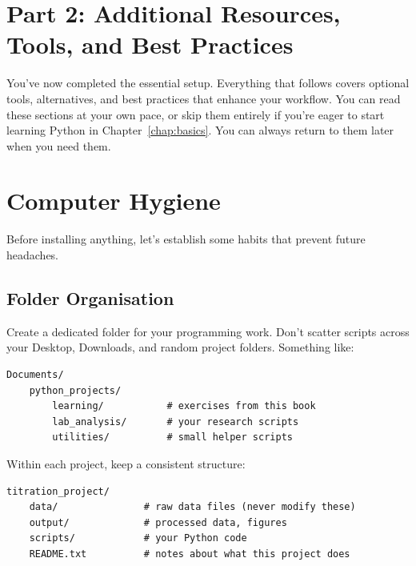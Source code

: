 
\section*{Part 2: Additional Resources, Tools, and Best Practices}

You've now completed the essential setup. Everything that follows covers optional tools, alternatives, and best practices that enhance your workflow. You can read these sections at your own pace, or skip them entirely if you're eager to start learning Python in Chapter~\ref{chap:basics}. You can always return to them later when you need them.


\section{Computer Hygiene}
\label{sec:hygiene}

Before installing anything, let's establish some habits that prevent future headaches.

\subsection{Folder Organisation}

Create a dedicated folder for your programming work. Don't scatter scripts across your Desktop, Downloads, and random project folders. Something like:

\begin{lstlisting}[style=shellstyle]
Documents/
    python_projects/
        learning/           # exercises from this book
        lab_analysis/       # your research scripts
        utilities/          # small helper scripts
\end{lstlisting}

Within each project, keep a consistent structure:

\begin{lstlisting}[style=shellstyle]
titration_project/
    data/               # raw data files (never modify these)
    output/             # processed data, figures
    scripts/            # your Python code
    README.txt          # notes about what this project does
\end{lstlisting}

